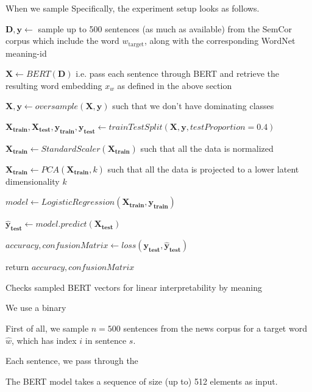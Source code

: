 \documentclass[a4paper,12pt,twoside,openright]{report}
\begin{document}
When we sample 
Specifically, the experiment setup looks as follows.

\begin{algorithm}[H]
\SetAlgoLined
{}
 $\mathbf{D}, \mathbf{y} \leftarrow $  sample up to 500 sentences (as much as available) from the SemCor corpus which include the word $w_{\text{target}}$, along with the corresponding WordNet meaning-id\;

$ \mathbf{X} \leftarrow BERT( \mathbf{D} )$ i.e. pass each sentence through BERT and retrieve the resulting word embedding $x_w$ as defined in the above section\;
 
$ \mathbf{X}, \mathbf{y} \leftarrow oversample( \mathbf{X}, \mathbf{y} )$ such that we don't have dominating classes\;
 
$ \mathbf{X_\text{train}}, \mathbf{X_\text{test}}, \mathbf{y_\text{train}}, \mathbf{y_\text{test}} \leftarrow trainTestSplit( \mathbf{X}, \mathbf{y}, testProportion=0.4 )$ \;

$ \mathbf{X_\text{train}} \leftarrow StandardScaler( \mathbf{X_\text{train}})$ such that all the data is normalized\;

$ \mathbf{X_\text{train}} \leftarrow PCA( \mathbf{X_\text{train}}, k )$ such that all the data is projected to a lower latent dimensionality $k$\;

$ model \leftarrow LogisticRegression( \mathbf{X_\text{train}}, \mathbf{y_\text{train}} )$ \;
    
$ \mathbf{\hat{y}_\text{test}} \leftarrow model.predict(\mathbf{X_\text{test}})$ \;

$ accuracy, confusionMatrix \leftarrow loss(\mathbf{y_\text{test}}, \mathbf{\hat{y}_\text{test}}) $ \;
    
return $ accuracy, confusionMatrix $\;
    
 \caption{Checks sampled BERT vectors for linear interpretability by meaning}
\end{algorithm}

We use a binary 

First of all, we sample $n=500$ sentences from the news corpus for a target word $\hat{w}$, which has index $i$ in sentence $s$.

Each sentence, we pass through the 

The BERT model takes a sequence of size (up to) 512 elements as input.
\end{document}
